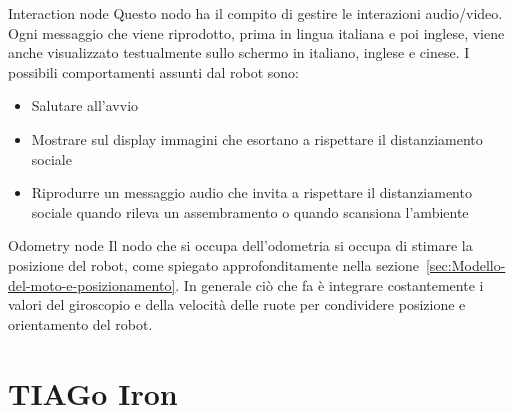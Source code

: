 \documentclass[10pt]{beamer}
\begin{document}
	\begin{frame}{Interaction node}
	Questo nodo ha il compito di gestire le interazioni audio/video. Ogni
	messaggio che viene riprodotto, prima in lingua italiana e poi inglese,
	viene anche visualizzato testualmente sullo schermo in italiano, inglese e
	cinese.  I possibili comportamenti assunti dal robot sono:
	\begin{itemize}
		\item Salutare all'avvio
		\item Mostrare sul display immagini che esortano a rispettare il
			distanziamento sociale
		\item Riprodurre un messaggio audio che invita a rispettare il distanziamento sociale quando
			rileva un assembramento o quando scansiona l'ambiente
	\end{itemize}
	\end{frame}

	\begin{frame}{Odometry node}
	Il nodo che si occupa dell'odometria si occupa di stimare la posizione del
	robot, come spiegato approfonditamente nella
	sezione~\ref{sec:Modello-del-moto-e-posizionamento}. In generale ciò che fa
	è integrare costantemente i valori del giroscopio e della velocità delle
	ruote per condividere posizione e orientamento del robot.
	\end{frame}
	
	
	\section{TIAGo Iron}\label{sec:TIAGo-Iron} 
	\frame{\sectionpage}
\end{document}
